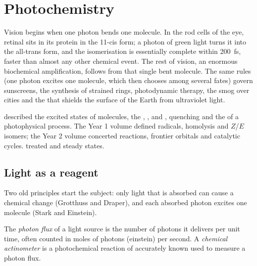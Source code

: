 \chapter{Photochemistry}\label{ch:b3:photochemistry}

Vision begins when one photon bends one molecule. In the rod cells of the eye,
retinal sits in its protein in the 11-cis form; a photon of green light turns
it into the all-trans form, and the isomerisation is essentially complete
within \qty{200}{fs}, faster than almost any other chemical event. The rest of
vision, an enormous biochemical amplification, follows from that single bent
molecule. The same rules (one photon excites one molecule, which then chooses
among several fates) govern sunscreens, the synthesis of strained rings,
photodynamic therapy, the smog over cities and the  that shields
the surface of the Earth from ultraviolet light.

\begin{recall}
 described the excited states of
molecules, the , ,  and
, quenching and the  of a photophysical process.
The Year 1 volume defined radicals, homolysis and $Z$/$E$ isomers; the Year 2
volume concerted reactions, frontier orbitals and catalytic cycles.
 treated  and steady states.
\end{recall}

\section{Light as a reagent}

Two old principles start the subject: only light that is absorbed can cause a
chemical change (Grotthuss and Draper), and each absorbed photon excites one
molecule (Stark and Einstein).

\begin{definition}\label{def:b3:photochemistry:photon-flux}
The \emph{photon flux} of a light source is the number of
photons it delivers per unit time, often counted in moles of photons (einstein)
per second. A \emph{chemical actinometer} is a
photochemical reaction of accurately known  used to measure a
photon flux.
\end{definition}

